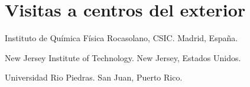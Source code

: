 \section{Visitas a centros del exterior}

\begin{timeline}
 Instituto de Química Física Rocasolano, CSIC. Madrid, España. 

 New Jersey Institute of Technology. New Jersey, Estados Unidos.

 Universidad Rio Piedras. San Juan, Puerto Rico.
\end{timeline}